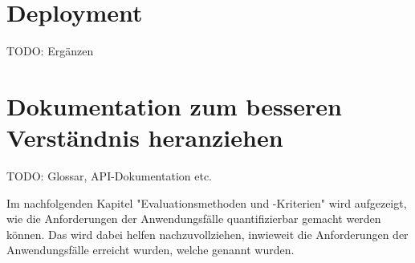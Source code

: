 \section{Deployment}
TODO: Ergänzen

\section{Dokumentation zum besseren Verständnis heranziehen}
TODO: Glossar, API-Dokumentation etc.

Im nachfolgenden Kapitel "Evaluationsmethoden und -Kriterien" wird aufgezeigt, wie die Anforderungen der Anwendungsfälle quantifizierbar gemacht werden können.
Das wird dabei helfen nachzuvollziehen, inwieweit die Anforderungen der Anwendungsfälle erreicht wurden, welche genannt wurden.
